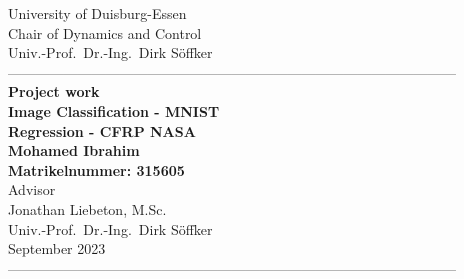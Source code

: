 \documentclass[12pt,fleqn]{article}
\begin{document}
\begin{titlepage}
  \begin{center}
    \vspace*{-2.5cm}
    \large{University of Duisburg-Essen}\\
   \large{Chair of Dynamics and Control}\\
    \large{Univ.-Prof.~Dr.-Ing.\ Dirk S\"offker}\\
    ------------------------------------------------------------------------------------------------\\[3.7cm]
    \LARGE{\textbf{Project work }}\\[1.5cm]
    \Large{\textbf{Image Classification - MNIST \\
    Regression - CFRP NASA }}\\[0.6cm]
    \vspace{1.2cm}
    \large{\textbf{Mohamed Ibrahim\\
    Matrikelnummer: 315605}}\\[1.5cm]
    \vspace*{3cm}
    \large{Advisor}\\[0.5cm]
    \large{Jonathan Liebeton, M.Sc.}\\
    \large{Univ.-Prof.\ Dr.-Ing.\ Dirk S\"offker }\\[0.5cm]\vfill
    \large{September 2023}\\[0.5cm]
    ------------------------------------------------------------------------------------------------\\[1.5cm]
  \end{center}
\end{titlepage}
%

\clearpage

\clearpage%
\tableofcontents
\listoffigures
\listoftables
\clearpage
{}
  
  \clearpage
  
  \clearpage
\end{document}
